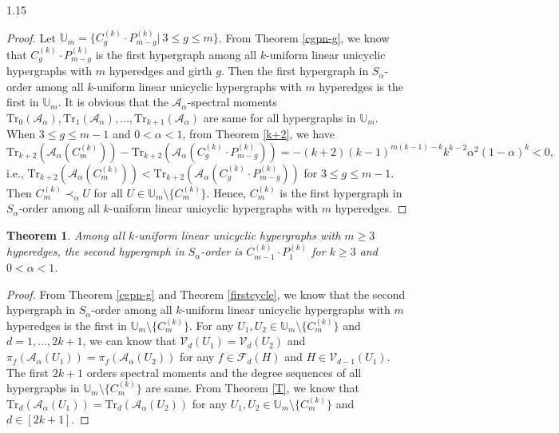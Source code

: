 \documentclass[preprint,12pt]{elsarticle1}
\newtheorem{thm}{Theorem}[section]
\numberwithin{equation}{section}
\begin{document}
\begin{spacing}{1.15}
\begin{proof}
Let $\mathbb{U}_{m}=\{C_{g}^{(k)}\cdot P_{m-g}^{(k)}|\ 3\le g\le m\}$.
From Theorem \ref{cgpn-g}, we know that $C_{g}^{(k)}\cdot P_{m-g}^{(k)}$ is the first hypergraph among all $k$-uniform linear unicyclic hypergraphs with $m$ hyperedges and girth $g$.
Then the first hypergraph in $S_{\alpha}$-order among all $k$-uniform linear unicyclic hypergraphs with $m$ hyperedges is the first in $\mathbb{U}_{m}$.
It is obvious that the $\mathcal{A}_{\alpha}$-spectral moments $\mathrm{Tr}_0(\mathcal{A}_{\alpha}),\mathrm{Tr}_1(\mathcal{A}_{\alpha}),\ldots,\mathrm{Tr}_{k+1}(\mathcal{A}_{\alpha})$ are same for all hypergraphs in $\mathbb{U}_m$.
When $3\le g\le m-1$ and $0<\alpha<1$, from Theorem \ref{k+2}, we have
$$\mathrm{Tr}_{k+2}(\mathcal{A}_{\alpha}(C_{m}^{(k)}))-\mathrm{Tr}_{k+2}(\mathcal{A}_{\alpha}(C_{g}^{(k)}\cdot P_{m-g}^{(k)}))=-(k+2)(k-1)^{m(k-1)-k}k^{k-2}\alpha^2(1-\alpha)^k<0,$$
i.e., $\mathrm{Tr}_{k+2}(\mathcal{A}_{\alpha}(C_{m}^{(k)}))<\mathrm{Tr}_{k+2}(\mathcal{A}_{\alpha}(C_{g}^{(k)}\cdot P_{m-g}^{(k)}))$ for $3\le g\le m-1$. Then $C_{m}^{(k)}\prec_{\alpha}U$ for all $U\in \mathbb{U}_{m}\setminus\{C_{m}^{(k)}\}$.
Hence, $C_{m}^{(k)}$ is the first hypergraph in $S_{\alpha}$-order among all $k$-uniform linear unicyclic hypergraphs with $m$ hyperedges.
\end{proof}

\begin{thm}
Among all $k$-uniform linear unicyclic hypergraphs with $m\ge3$ hyperedges, the second hypergraph in $S_{\alpha}$-order is $C_{m-1}^{(k)}\cdot P_{1}^{(k)}$ for $k\ge3$ and $0<\alpha<1$.
\end{thm}

\begin{proof}
From Theorem \ref{cgpn-g} and Theorem \ref{firstcycle}, we know that the second hypergraph in $S_{\alpha}$-order among all $k$-uniform linear unicyclic hypergraphs with $m$ hyperedges is the first in $\mathbb{U}_{m}\setminus\{C_{m}^{(k)}\}$.
For any $U_1, U_2\in\mathbb{U}_{m}\setminus\{C_{m}^{(k)}\}$ and $d=1,\ldots,2k+1$, we can know that $\mathcal{V}_{d}(U_1)=\mathcal{V}_{d}(U_2)$ and $\pi_{f}(\mathcal{A}_{\alpha}(U_1))=\pi_{f}(\mathcal{A}_{\alpha}(U_2))$ for any $f\in\mathcal{F}_{d}(H)$ and $H\in\mathcal{V}_{d-1}(U_1)$.
The first $2k+1$ orders spectral moments and the degree sequences of all hypergraphs in $\mathbb{U}_{m}\setminus\{C_{m}^{(k)}\}$ are same.
From Theorem \ref{T}, we know that $\mathrm{Tr}_{d}(\mathcal{A}_{\alpha}(U_1))=\mathrm{Tr}_{d}(\mathcal{A}_{\alpha}(U_2))$ for any $U_1, U_2\in\mathbb{U}_{m}\setminus\{C_{m}^{(k)}\}$ and $d\in[2k+1]$.


\end{proof}
\end{spacing}
\end{document}
